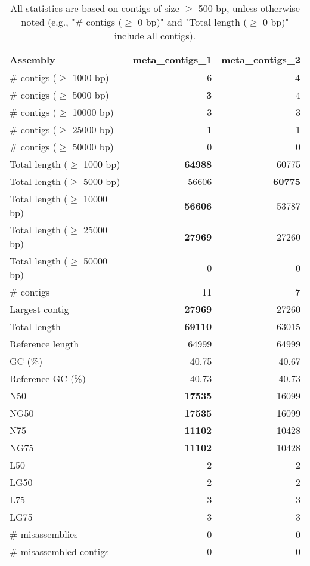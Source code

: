 \documentclass[12pt,a4paper]{article}
\begin{document}
\begin{table}[ht]
\begin{center}
\caption{All statistics are based on contigs of size $\geq$ 500 bp, unless otherwise noted (e.g., "\# contigs ($\geq$ 0 bp)" and "Total length ($\geq$ 0 bp)" include all contigs).}
\begin{tabular}{|l*{2}{|r}|}
\hline
Assembly & meta\_contigs\_1 & meta\_contigs\_2 \\ \hline
\# contigs ($\geq$ 1000 bp) & 6 & {\bf 4} \\ \hline
\# contigs ($\geq$ 5000 bp) & {\bf 3} & 4 \\ \hline
\# contigs ($\geq$ 10000 bp) & 3 & 3 \\ \hline
\# contigs ($\geq$ 25000 bp) & 1 & 1 \\ \hline
\# contigs ($\geq$ 50000 bp) & 0 & 0 \\ \hline
Total length ($\geq$ 1000 bp) & {\bf 64988} & 60775 \\ \hline
Total length ($\geq$ 5000 bp) & 56606 & {\bf 60775} \\ \hline
Total length ($\geq$ 10000 bp) & {\bf 56606} & 53787 \\ \hline
Total length ($\geq$ 25000 bp) & {\bf 27969} & 27260 \\ \hline
Total length ($\geq$ 50000 bp) & 0 & 0 \\ \hline
\# contigs & 11 & {\bf 7} \\ \hline
Largest contig & {\bf 27969} & 27260 \\ \hline
Total length & {\bf 69110} & 63015 \\ \hline
Reference length & 64999 & 64999 \\ \hline
GC (\%) & 40.75 & 40.67 \\ \hline
Reference GC (\%) & 40.73 & 40.73 \\ \hline
N50 & {\bf 17535} & 16099 \\ \hline
NG50 & {\bf 17535} & 16099 \\ \hline
N75 & {\bf 11102} & 10428 \\ \hline
NG75 & {\bf 11102} & 10428 \\ \hline
L50 & 2 & 2 \\ \hline
LG50 & 2 & 2 \\ \hline
L75 & 3 & 3 \\ \hline
LG75 & 3 & 3 \\ \hline
\# misassemblies & 0 & 0 \\ \hline
\# misassembled contigs & 0 & 0 \\ \hline

\end{tabular}
\end{center}
\end{table}
\end{document}
